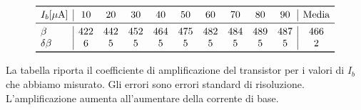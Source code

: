 \begin{table}[h]
    \centering
    \[
    \begin{array}{l | c c c c c c c c c | c}
        \toprule
        I_b [\mu\text{A}] & 10 & 20 & 30 & 40 & 50 & 60 & 70 & 80 & 90 & \text{Media} \\
        \midrule 
        \beta & 422 & 442 & 452 & 464 & 475 & 482 & 484 & 489 & 487 & 466 \\
        \delta\beta & 6 & 5 & 5 & 5 & 5 & 5 & 5 & 5 & 5 & 2 \\
        \bottomrule
    \end{array}\]
    \caption{La tabella riporta il coefficiente di amplificazione del transistor per i valori di $I_b$ che abbiamo
        misurato. Gli errori sono errori standard di risoluzione. L'amplificazione aumenta
        all'aumentare della corrente di base.}
    \label{tab:tab}
\end{table}
